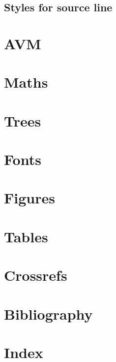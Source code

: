 \documentclass[output=book
  ,nonflat
  ,modfonts,
  ,colorlinks
  ,showindex
  ,draftmode
  ,nobabel
  ,booklanguage=french
  ]{langsci/langscibook}
\begin{document}
\subsection{Styles for source line}




\section{AVM}


\section{Maths}


\section{Trees}


\section{Fonts}

 

\section{Figures}\label{sec:tables} 

\section{Tables}\label{sec:tables}


\section{Crossrefs}


\section{Bibliography}

%   
\printbibliography[heading=references] 

\section{Index}
 
\end{document}
